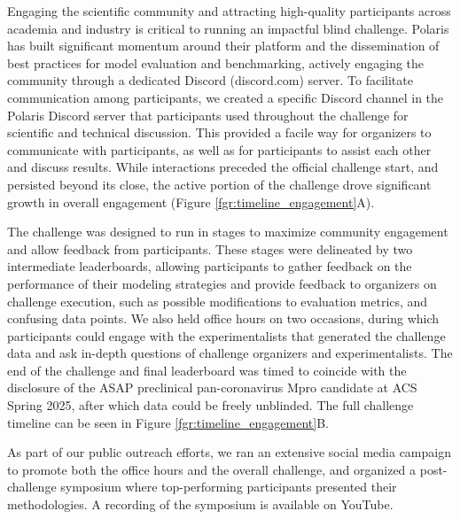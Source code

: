 \documentclass[journal=jcim,manuscript=article]{achemso}
\begin{document}
Engaging the scientific community and attracting high-quality participants across academia and industry is critical to running an impactful blind challenge. Polaris has built significant momentum around their platform and the dissemination of best practices for model evaluation and benchmarking\cite{wognum_call_2024}, actively engaging the community through a dedicated Discord (discord.com) server. To facilitate communication among participants, we created a specific Discord channel in the Polaris Discord server that participants used throughout the challenge for scientific and technical discussion. This provided a facile way for organizers to communicate with participants, as well as for participants to assist each other and discuss results. While interactions preceded the official challenge start, and persisted beyond its close, the active portion of the challenge drove significant growth in overall engagement (Figure \ref{fgr:timeline_engagement}A).

The challenge was designed to run in stages to maximize community engagement and allow feedback from participants. These stages were delineated by two intermediate leaderboards, allowing participants to gather feedback on the performance of their modeling strategies and provide feedback to organizers on challenge execution, such as possible modifications to evaluation metrics, and confusing data points. We also held office hours on two occasions, during which participants could engage with the experimentalists that generated the challenge data and ask in-depth questions of challenge organizers and experimentalists. The end of the challenge and final leaderboard was timed to coincide with the disclosure of the ASAP preclinical pan-coronavirus Mpro candidate at ACS Spring 2025\cite{griffen_2025_acs}, after which data could be freely unblinded. The full challenge timeline can be seen in Figure \ref{fgr:timeline_engagement}B.

As part of our public outreach efforts, we ran an extensive social media campaign to promote both the office hours and the overall challenge, and organized a post-challenge symposium where top-performing participants presented their methodologies. A recording of the symposium is available on YouTube\cite{openadmet_asap_workshop}. 
\end{document}
